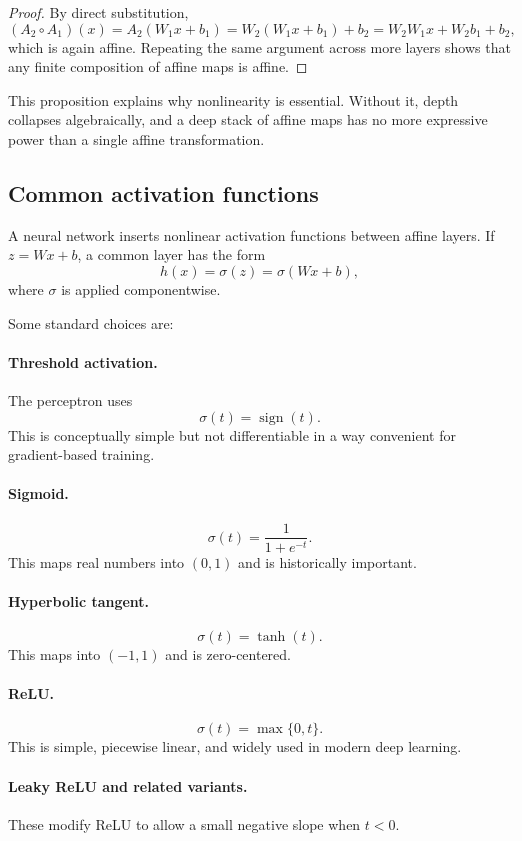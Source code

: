 \begin{proof}
By direct substitution,
\[
(A_2\circ A_1)(x)
=
A_2(W_1x+b_1)
=
W_2(W_1x+b_1)+b_2
=
W_2W_1x + W_2b_1+b_2,
\]
which is again affine. Repeating the same argument across more layers shows that any finite composition of affine maps is affine.
\end{proof}

This proposition explains why nonlinearity is essential. Without it, depth collapses algebraically, and a deep stack of affine maps has no more expressive power than a single affine transformation.

\subsection*{Common activation functions}

A neural network inserts nonlinear activation functions between affine layers. If $z=Wx+b$, a common layer has the form
\[
h(x)=\sigma(z)=\sigma(Wx+b),
\]
where $\sigma$ is applied componentwise.

Some standard choices are:

\paragraph{Threshold activation.}
The perceptron uses
\[
\sigma(t)=\operatorname{sign}(t).
\]
This is conceptually simple but not differentiable in a way convenient for gradient-based training.

\paragraph{Sigmoid.}
\[
\sigma(t)=\frac{1}{1+e^{-t}}.
\]
This maps real numbers into $(0,1)$ and is historically important.

\paragraph{Hyperbolic tangent.}
\[
\sigma(t)=\tanh(t).
\]
This maps into $(-1,1)$ and is zero-centered.

\paragraph{ReLU.}
\[
\sigma(t)=\max\{0,t\}.
\]
This is simple, piecewise linear, and widely used in modern deep learning.

\paragraph{Leaky ReLU and related variants.}
These modify ReLU to allow a small negative slope when $t<0$.

